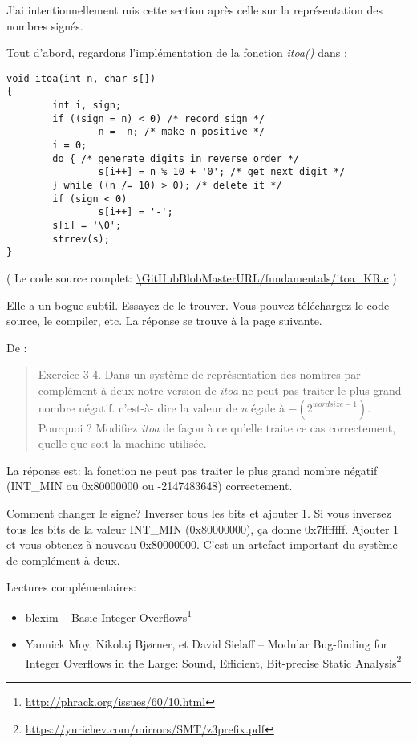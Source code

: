 
J'ai intentionnellement mis cette section après celle sur la représentation des nombres
signés.

Tout d'abord, regardons l'implémentation de la fonction  \emph{itoa()} dans \InSqBrackets{\KRBook}:

\begin{lstlisting}[style=customc]
void itoa(int n, char s[])
{
        int i, sign;
        if ((sign = n) < 0) /* record sign */
                n = -n; /* make n positive */
        i = 0;
        do { /* generate digits in reverse order */
                s[i++] = n % 10 + '0'; /* get next digit */
        } while ((n /= 10) > 0); /* delete it */
        if (sign < 0)
                s[i++] = '-';
        s[i] = '\0';
        strrev(s);
}
\end{lstlisting}

( Le code source complet: \url{\GitHubBlobMasterURL/fundamentals/itoa_KR.c} )

Elle a un bogue subtil. Essayez de le trouver. Vous pouvez téléchargez le code source,
le compiler, etc.
La réponse se trouve à la page suivante.

\clearpage

De \InSqBrackets{\KRBook}:

\begin{framed}
\begin{quotation}
Exercice 3-4. Dans un système de représentation des nombres par complément à deux
notre version de \emph{itoa} ne peut pas traiter le plus grand nombre négatif. c'est-à-
dire la valeur de \emph{n} égale à $-(2^{wordsize-1})$. Pourquoi ? Modifiez \emph{itoa}
de façon à ce qu'elle traite ce cas correctement, quelle que soit la machine utilisée.
\end{quotation}
\end{framed}

La réponse est: la fonction ne peut pas traiter le plus grand nombre négatif (INT\_MIN
ou 0x80000000 ou -2147483648) correctement.

Comment changer le signe? Inverser tous les bits et ajouter 1.
Si vous inversez tous les bits de la valeur INT\_MIN (0x80000000), ça donne 0x7fffffff.
Ajouter 1 et vous obtenez à nouveau 0x80000000.
C'est un artefact important du système de complément à deux.

Lectures  complémentaires:

\begin{itemize}
\item blexim -- Basic Integer Overflows\footnote{\url{http://phrack.org/issues/60/10.html}}

\item Yannick Moy, Nikolaj Bjørner, et David Sielaff -- Modular Bug-finding for Integer Overflows in the Large: Sound, Efficient, Bit-precise Static Analysis\footnote{\url{https://yurichev.com/mirrors/SMT/z3prefix.pdf}}
\end{itemize}

